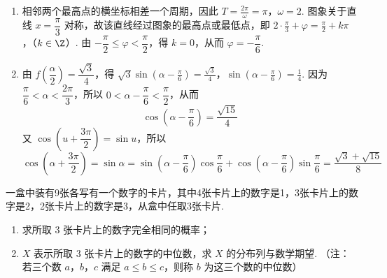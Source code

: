 \begin{solution}
\begin{enumerate}
\item 相邻两个最高点的横坐标相差一个周期，因此
\(T=\frac{2\pi}{\omega}=\pi\)，\(\omega=2\).
图象关于直线 \(x=\dfrac{\pi}{3}\) 对称，故该直线经过图象的最高点或最低点，即
\(2\cdot\frac{\pi}{3}+\varphi=\frac{\pi}{2}+k\pi\)，（\(k\in\Z\)）.
由 \(-\dfrac{\pi}{2}\leqslant\varphi<\dfrac{\pi}{2}\)，得 \(k=0\)，从而 \(\varphi=-\dfrac{\pi}{6}\).

\item 由 \(f\left(\dfrac{\alpha}{2}\right)=\dfrac{\sqrt{3}}{4}\)，得
\(\sqrt{3}\sin\left(\alpha-\frac{\pi}{6}\right)=\frac{\sqrt{3}}{4}\)，\(\sin\left(\alpha-\frac{\pi}{6}\right)=\frac{1}{4}\).
因为 \(\dfrac{\pi}{6}<\alpha<\dfrac{2\pi}{3}\)，所以 \(0<\alpha-\dfrac{\pi}{6}<\dfrac{\pi}{2}\)，从而
\[
\cos\left(\alpha-\frac{\pi}{6}\right)=\frac{\sqrt{15}}{4}
\]
又 \(\cos\left(u+\dfrac{3\pi}{2}\right)=\sin u\)，所以
\[
\cos\left(\alpha+\frac{3\pi}{2}\right)
 =\sin\alpha
 =\sin\left(\alpha-\frac{\pi}{6}\right)\cos\frac{\pi}{6}
  +\cos\left(\alpha-\frac{\pi}{6}\right)\sin\frac{\pi}{6}
 =\frac{\sqrt{3}+\sqrt{15}}{8}
\]
\end{enumerate}
\end{solution}

\begin{problem}
一盒中装有9张各写有一个数字的卡片，其中4张卡片上的数字是1，3张卡片上的数字是2，2张卡片上的数字是3，从盒中任取3张卡片.

\begin{enumerate}
\item 求所取 3 张卡片上的数字完全相同的概率；
\item \(X\) 表示所取 3 张卡片上的数字的中位数，求 \(X\) 的分布列与数学期望. （注：若三个数 \(a\)，\(b\)，\(c\) 满足 \(a \leqslant b \leqslant c\)，则称 \(b\) 为这三个数的中位数）
\end{enumerate}
\end{problem}


